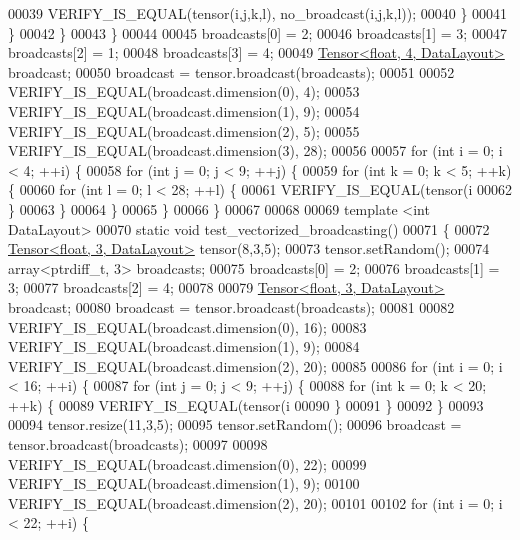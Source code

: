 \begin{DoxyCode}
00039           VERIFY\_IS\_EQUAL(tensor(i,j,k,l), no\_broadcast(i,j,k,l));
00040         \}
00041       \}
00042     \}
00043   \}
00044 
00045   broadcasts[0] = 2;
00046   broadcasts[1] = 3;
00047   broadcasts[2] = 1;
00048   broadcasts[3] = 4;
00049   \hyperlink{class_eigen_1_1_tensor}{Tensor<float, 4, DataLayout>} broadcast;
00050   broadcast = tensor.broadcast(broadcasts);
00051 
00052   VERIFY\_IS\_EQUAL(broadcast.dimension(0), 4);
00053   VERIFY\_IS\_EQUAL(broadcast.dimension(1), 9);
00054   VERIFY\_IS\_EQUAL(broadcast.dimension(2), 5);
00055   VERIFY\_IS\_EQUAL(broadcast.dimension(3), 28);
00056 
00057   \textcolor{keywordflow}{for} (\textcolor{keywordtype}{int} i = 0; i < 4; ++i) \{
00058     \textcolor{keywordflow}{for} (\textcolor{keywordtype}{int} j = 0; j < 9; ++j) \{
00059       \textcolor{keywordflow}{for} (\textcolor{keywordtype}{int} k = 0; k < 5; ++k) \{
00060         \textcolor{keywordflow}{for} (\textcolor{keywordtype}{int} l = 0; l < 28; ++l) \{
00061           VERIFY\_IS\_EQUAL(tensor(i%
00062         \}
00063       \}
00064     \}
00065   \}
00066 \}
00067 
00068 
00069 \textcolor{keyword}{template} <\textcolor{keywordtype}{int} DataLayout>
00070 \textcolor{keyword}{static} \textcolor{keywordtype}{void} test\_vectorized\_broadcasting()
00071 \{
00072   \hyperlink{class_eigen_1_1_tensor}{Tensor<float, 3, DataLayout>} tensor(8,3,5);
00073   tensor.setRandom();
00074   array<ptrdiff\_t, 3> broadcasts;
00075   broadcasts[0] = 2;
00076   broadcasts[1] = 3;
00077   broadcasts[2] = 4;
00078 
00079   \hyperlink{class_eigen_1_1_tensor}{Tensor<float, 3, DataLayout>} broadcast;
00080   broadcast = tensor.broadcast(broadcasts);
00081 
00082   VERIFY\_IS\_EQUAL(broadcast.dimension(0), 16);
00083   VERIFY\_IS\_EQUAL(broadcast.dimension(1), 9);
00084   VERIFY\_IS\_EQUAL(broadcast.dimension(2), 20);
00085 
00086   \textcolor{keywordflow}{for} (\textcolor{keywordtype}{int} i = 0; i < 16; ++i) \{
00087     \textcolor{keywordflow}{for} (\textcolor{keywordtype}{int} j = 0; j < 9; ++j) \{
00088       \textcolor{keywordflow}{for} (\textcolor{keywordtype}{int} k = 0; k < 20; ++k) \{
00089         VERIFY\_IS\_EQUAL(tensor(i%
00090       \}
00091     \}
00092   \}
00093 
00094   tensor.resize(11,3,5);
00095   tensor.setRandom();
00096   broadcast = tensor.broadcast(broadcasts);
00097 
00098   VERIFY\_IS\_EQUAL(broadcast.dimension(0), 22);
00099   VERIFY\_IS\_EQUAL(broadcast.dimension(1), 9);
00100   VERIFY\_IS\_EQUAL(broadcast.dimension(2), 20);
00101 
00102   \textcolor{keywordflow}{for} (\textcolor{keywordtype}{int} i = 0; i < 22; ++i) \{

\end{DoxyCode}

